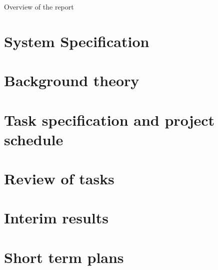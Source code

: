 \documentclass[12pt,a4paper]{report}
\begin{document}
Overview of the report

\section*{System Specification}

\section*{Background theory}
\section*{Task specification and project schedule}
\section*{Review of tasks}
\section*{Interim results}
\section*{Short term plans}
\end{document}
